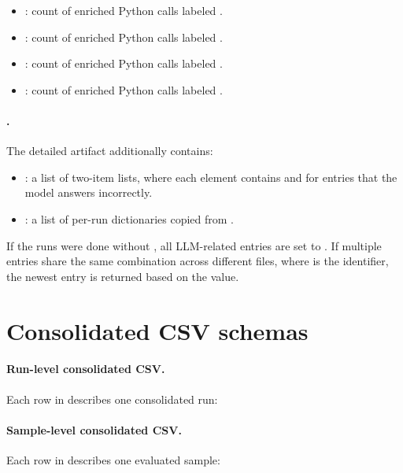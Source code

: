 \documentclass[11pt]{article}
\begin{document}
\begin{itemize}
\begin{itemize}
    \item {}: count of enriched Python calls labeled .
    \item {}: count of enriched Python calls labeled .
    \item {}: count of enriched Python calls labeled .
    \item {}: count of enriched Python calls labeled .
  \end{itemize}
\end{itemize}

\paragraph{\texorpdfstring{}{<row\_slug>.json}.}
The detailed artifact additionally contains:
\begin{itemize}
  \item {}: a list of two-item lists, where each element contains  and \termRunID for entries that the model answers incorrectly.
  \item {}: a list of per-run dictionaries copied from .
\end{itemize}

If the runs were done without , all LLM-related entries are set to .
If multiple entries share the same  combination across different  files, where  is the \termSimulator identifier, the newest entry is returned based on the  value.

\section{Consolidated CSV schemas}
\label{sec:experiment-plan-consolidated-csv-schema-appendix}

\paragraph{Run-level consolidated CSV.}
Each row in  describes one consolidated run:

\allRunsCsvSchemaTable

\paragraph{Sample-level consolidated CSV.}
Each row in  describes one evaluated sample:

\allSamplesCsvSchemaTable
\end{document}
